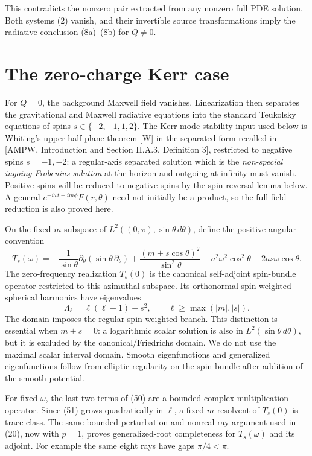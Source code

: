 \documentclass[
  10pt,
  a4paper,
]{article}
\begin{document}
This contradicts the nonzero pair extracted from any nonzero full PDE
solution. Both systems (2) vanish, and their invertible source
transformations imply the radiative conclusion (8a)--(8b) for \(Q\ne0\).

\section{The zero-charge Kerr case}\label{the-zero-charge-kerr-case}

For \(Q=0\), the background Maxwell field vanishes. Linearization then
separates the gravitational and Maxwell radiative equations into the
standard Teukolsky equations of spins \(s\in\{-2,-1,1,2\}\). The Kerr
mode-stability input used below is Whiting's upper-half-plane theorem
{[}W{]} in the separated form recalled in {[}AMPW, Introduction and
Section II.A.3, Definition 3{]}, restricted to negative spins
\(s=-1,-2\): a regular-axis separated solution which is the
\emph{non-special ingoing Frobenius solution} at the horizon and
outgoing at infinity must vanish. Positive spins will be reduced to
negative spins by the spin-reversal lemma below. A general
\(e^{-i\omega t+im\phi}F(r,\theta)\) need not initially be a product, so
the full-field reduction is also proved here.

On the fixed-\(m\) subspace of \(L^2((0,\pi),\sin\theta\,d\theta)\),
define the positive angular convention \[
 T_s(\omega)=
 -\frac1{\sin\theta}\partial_\theta(\sin\theta\,\partial_\theta)
 +\frac{(m+s\cos\theta)^2}{\sin^2\theta}
 -a^2\omega^2\cos^2\theta+2as\omega\cos\theta .
 \tag{50}
\] The zero-frequency realization \(T_s(0)\) is the canonical
self-adjoint spin-bundle operator restricted to this azimuthal subspace.
Its orthonormal spin-weighted spherical harmonics have eigenvalues \[
 \Lambda_\ell=\ell(\ell+1)-s^2,\qquad
 \ell\ge\max(|m|,|s|).
 \tag{51}
\] The domain imposes the regular spin-weighted branch. This distinction
is essential when \(m\pm s=0\): a logarithmic scalar solution is also in
\(L^2(\sin\theta\,d\theta)\), but it is excluded by the
canonical/Friedrichs domain. We do not use the maximal scalar interval
domain. Smooth eigenfunctions and generalized eigenfunctions follow from
elliptic regularity on the spin bundle after addition of the smooth
potential.

For fixed \(\omega\), the last two terms of (50) are a bounded complex
multiplication operator. Since (51) grows quadratically in \(\ell\), a
fixed-\(m\) resolvent of \(T_s(0)\) is trace class. The same
bounded-perturbation and nonreal-ray argument used in (20), now with
\(p=1\), proves generalized-root completeness for \(T_s(\omega)\) and
its adjoint. For example the same eight rays have gaps \(\pi/4<\pi\).
\end{document}
